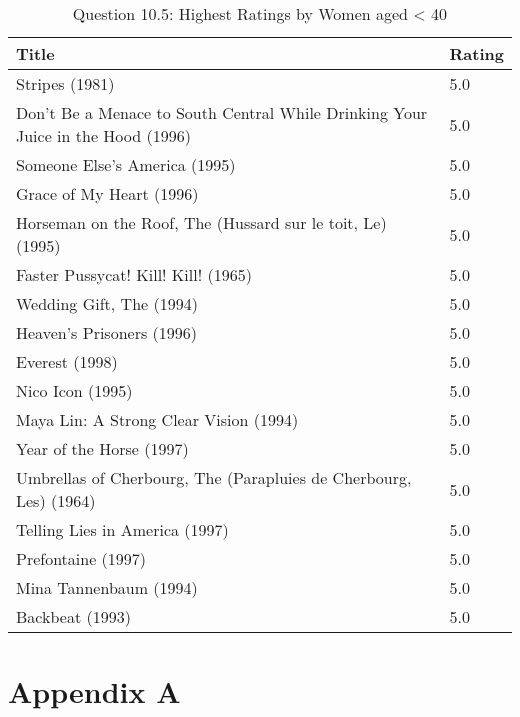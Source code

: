 \begin{table}[h!]
\centering
\begin{tabular}{| l | l |}
\hline
Title & Rating \\
\hline
Stripes (1981) & 5.0 \\
Don't Be a Menace to South Central While Drinking Your Juice in the Hood (1996) & 5.0 \\
Someone Else's America (1995) & 5.0 \\
Grace of My Heart (1996) & 5.0 \\
Horseman on the Roof, The (Hussard sur le toit, Le) (1995) & 5.0 \\
Faster Pussycat! Kill! Kill! (1965) & 5.0 \\
Wedding Gift, The (1994) & 5.0 \\
Heaven's Prisoners (1996) & 5.0 \\
Everest (1998) & 5.0 \\
Nico Icon (1995) & 5.0 \\
Maya Lin: A Strong Clear Vision (1994) & 5.0 \\
Year of the Horse (1997) & 5.0 \\
Umbrellas of Cherbourg, The (Parapluies de Cherbourg, Les) (1964) & 5.0 \\
Telling Lies in America (1997) & 5.0 \\
Prefontaine (1997) & 5.0 \\
Mina Tannenbaum (1994) & 5.0 \\
Backbeat (1993) & 5.0 \\
\hline
\end{tabular}
\caption{Question 10.5: Highest Ratings by Women aged < 40}
\label{tab:hrbaow}
\end{table}

\clearpage

\section{Appendix A}
